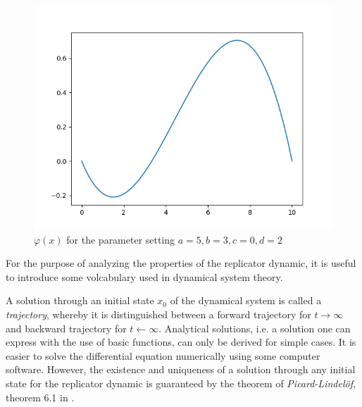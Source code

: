 \documentclass[11pt]{article}
\begin{document}
\begin{figure}[h]
        \label{fig:polynominal}
        \centering
        \includegraphics[scale=0.5]{polynominal.png}
        \caption{$\varphi(x)$ for the parameter setting $a=5, b=3, c=0, d=2$}
\end{figure}
For the purpose of analyzing the properties of the replicator dynamic, it is 
useful to introduce some volcabulary used in dynamical system theory. 

A solution through an initial state $x_0$ of the dynamical system is called a 
\textit{trajectory}, whereby it is distinguished between a forward trajectory 
for $t \rightarrow \infty$ and backward trajectory for $t \leftarrow \infty$.
Analytical solutions, i.e. a solution one can express with the use of
basic functions, can only be derived for simple cases. 
It is easier to solve the differential equation numerically using some
computer software. 
However, the existence and uniqueness of a solution through
any initial state for the replicator dynamic is guaranteed by the theorem 
of \textit{Picard-Lindel\"of}, theorem 6.1 in 
\textcite[74]{weibull_evolutionary_1997}. 
\end{document}
